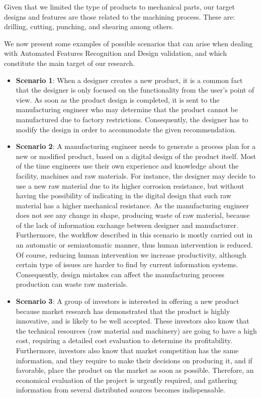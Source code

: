 Given that we limited the type of products to mechanical parts, our target designs and features are those related to the machining process. These are: drilling, cutting, punching, and shearing among others. 

We now present some examples of possible scenarios that can arise when dealing with Automated Features Recognition and Design validation, and which constitute the main target of our research.

\begin{itemize}
	
	\item \textbf{Scenario 1}: When a designer creates a new product, it is a common fact that the designer is only focused on the functionality from the user’s point of view. As soon as the product design  is completed, it is sent to the manufacturing engineer who may determine that the product cannot be manufactured due to factory restrictions. Consequently, the designer has to modify the design in order to accommodate the given recommendation. 
	\item \textbf{Scenario 2}: A manufacturing engineer needs to generate a process plan for a new or modified product, based on a digital design of the product itself. Most of the time  engineers use   their own experience and knowledge about the facility, machines and raw materials. For instance, the designer may decide to use a new raw material due to its higher corrosion resistance, but without having the possibility of indicating in the digital design that such raw material has a higher mechanical   resistance. As the manufacturing engineer does not see any change in shape, producing   waste of raw material, because of the lack of information exchange between designer and manufacturer. Furthermore, the workflow described in this scenario is mostly carried out in an automatic or semiautomatic manner, thus human intervention is reduced. Of course, reducing human intervention we increase productivity, although certain type of issues are harder to find by current information systems. Consequently, design mistakes can affect the manufacturing process production can waste raw materials. 
	
	\item \textbf{Scenario 3}: A group of investors is interested in offering a new product because market research has demonstrated that the product is highly innovative, and is likely to be well accepted. These investors also know that the technical resources (raw material and machinery) are going to have a high cost, requiring a detailed cost evaluation to determine its profitability. Furthermore, investors also know that market competition has the same information, and they require to make their decisions on producing it, and if favorable, place the product on the market as soon as possible. Therefore, an economical evaluation of the project is urgently required, and gathering information from several distributed sources becomes indispensable. 
	
\end{itemize}


